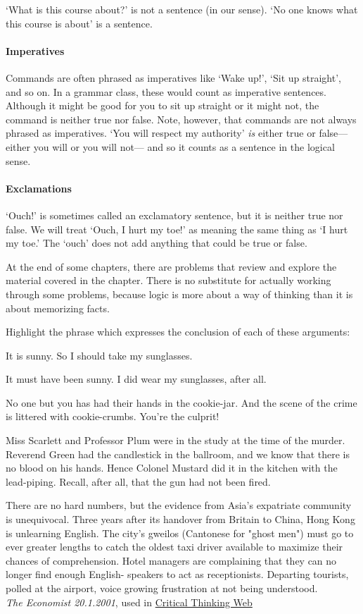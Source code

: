 `What is this course about?' is not a sentence (in our sense). `No one knows what this course is about' is a sentence.

\paragraph{Imperatives} Commands are often phrased as imperatives like `Wake up!', `Sit up straight', and so on. In a grammar class, these would count as imperative sentences. Although it might be good for you to sit up straight or it might not, the command is neither true nor false. Note, however, that commands are not always phrased as imperatives. `You will respect my authority' \emph{is} either true or false--- either you will or you will not--- and so it counts as a sentence in the logical sense.

\paragraph{Exclamations} `Ouch!' is sometimes called an exclamatory sentence, but it is neither true nor false. We will treat `Ouch, I hurt my toe!' as meaning the same thing as `I hurt my toe.' The `ouch' does not add anything that could be true or false.


\practiceproblems
At the end of some chapters, there are problems that review and explore the material covered in the chapter. There is no substitute for actually working through some problems, because logic is more about a way of thinking than it is about memorizing facts.

\medskip

Highlight the phrase which expresses the conclusion of each of these arguments:
\begin{earg}
	\item It is sunny. So I should take my sunglasses.
	\item It must have been sunny. I did wear my sunglasses, after all.
	\item No one but you has had their hands in the cookie-jar. And the scene of the crime is littered with cookie-crumbs. You're the culprit!
	\item Miss Scarlett and Professor Plum were in the study at the time of the murder. Reverend Green had the candlestick in the ballroom, and we know that there is no blood on his hands. Hence Colonel Mustard did it in the kitchen with the lead-piping. Recall, after all, that the gun had not been fired.
	\item There are no hard numbers, but the evidence from Asia's expatriate community is unequivocal. Three years after its handover from Britain to China, Hong Kong is unlearning English. The city's gweilos (Cantonese for "ghost men") must go to ever greater lengths to catch the oldest taxi driver available to maximize their chances of comprehension. Hotel managers are complaining that they can no longer find enough English- speakers to act as receptionists. Departing tourists, polled at the airport, voice growing frustration at not being understood. \\ \emph{The Economist 20.1.2001}, used in \href{https://philosophy.hku.hk/think/arg/arg.php}{Critical Thinking Web}
\end{earg}


